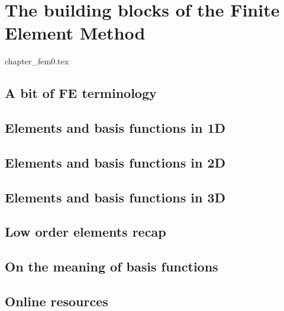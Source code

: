 \chapter{The building blocks of the Finite Element Method} %
\begin{flushright} {\tiny {\color{gray} chapter\_fem0.tex}} \end{flushright}

\section{A bit of FE terminology}\label{sec:terminology}  %
\newpage
\section{Elements and basis functions in 1D}\label{sec:elts1D}  %
\newpage
\section{Elements and basis functions in 2D}\label{sec:shpfct2d}  %
\newpage
\section{Elements and basis functions in 3D}  %
\newpage
\section{Low order elements recap}  %
\newpage
\section{On the meaning of basis functions}  %
\newpage
\section{Online resources}  %

